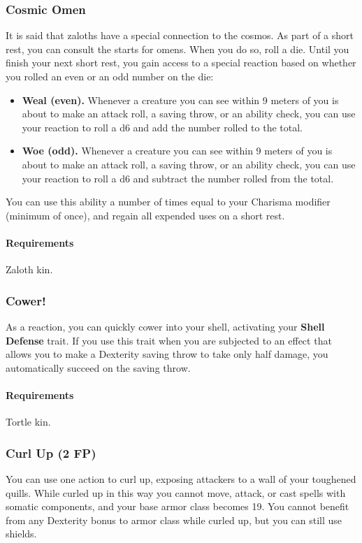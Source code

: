 \subsubsection{Cosmic Omen} \label{feat::cosmicomen}
    It is said that zaloths have a special connection to the cosmos.
    As part of a short rest, you can consult the starts for omens.
    When you do so, roll a die.
    Until you finish your next short rest, you gain access to a special reaction based on whether you rolled an even or an odd number on the die:
    \begin{itemize}
        \item \textbf{Weal (even).} Whenever a creature you can see within 9 meters of you is about to make an attack roll, a saving throw, or an ability check, you can use your reaction to roll a d6 and add the number rolled to the total.
        \item \textbf{Woe (odd).} Whenever a creature you can see within 9 meters of you is about to make an attack roll, a saving throw, or an ability check, you can use your reaction to roll a d6 and subtract the number rolled from the total.
    \end{itemize}
    You can use this ability a number of times equal to your Charisma modifier (minimum of once), and regain all expended uses on a short rest.
    \paragraph{Requirements} Zaloth kin.
\subsubsection{Cower!} \label{feat::cower}
    As a reaction, you can quickly cower into your shell, activating your \textbf{Shell Defense} trait.
    If you use this trait when you are subjected to an effect that allows you to make a Dexterity saving throw to take only half damage, you automatically succeed on the saving throw.
    \paragraph{Requirements} Tortle kin.
\subsubsection{Curl Up (2 FP)} \label{feat::curlup}
    You can use one action to curl up, exposing attackers to a wall of your toughened quills.
    While curled up in this way you cannot move, attack, or cast spells with somatic components, and your base armor class becomes 19.
    You cannot benefit from any Dexterity bonus to armor class while curled up, but you can still use shields.

